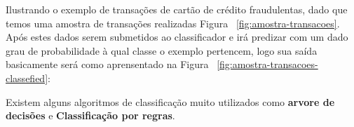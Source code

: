 Ilustrando o exemplo de transações de cartão de crédito fraudulentas, dado que temos uma amostra de transações realizadas 
 Figura ~\ref{fig:amostra-transacoes}. Após estes dados serem submetidos ao classificador e irá predizar com um dado grau de probabilidade 
à qual classe o exemplo pertencem, logo sua saída basicamente será como aprensentado na Figura ~\ref{fig:amostra-transacoes-classefied}:
\begin{figure}[ht!]
	\centering
\end{figure}
\begin{figure}[ht!]
	\centering
\end{figure}

Existem alguns algoritmos de classificação muito utilizados como  \textbf{arvore de decisões} e \textbf{Classificação por regras}.


